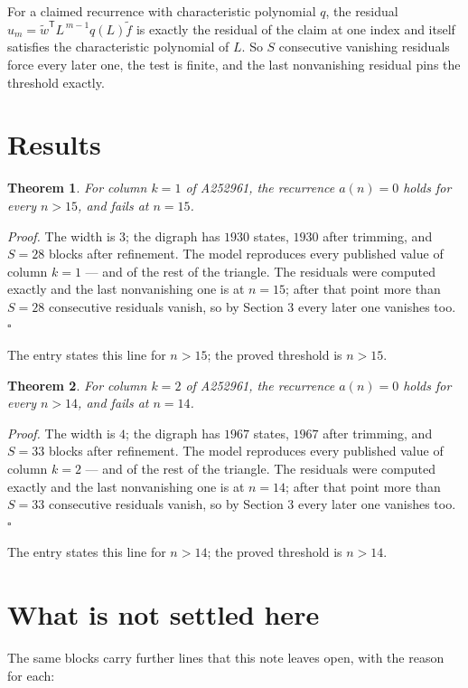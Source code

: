 \documentclass[11pt]{article}
\newtheorem{theorem}{Theorem}
\theoremstyle{definition}
\begin{document}
For a claimed recurrence with characteristic polynomial $q$, the residual $u_m = \tilde w^{\mathsf T}L^{\,m-1}q(L)\tilde f$ is exactly the residual of the claim at one index and itself satisfies the characteristic polynomial of $L$. So $S$ consecutive vanishing residuals force every later one, the test is finite, and the last nonvanishing residual pins the threshold exactly.

\section{Results}

\begin{theorem} For column $k = 1$ of A252961, the recurrence $a(n) = 0$ holds for every $n > 15$, and fails at $n = 15$.\end{theorem}

{\itshape Proof.} The width is $3$; the digraph has $1930$ states, $1930$ after trimming, and $S = 28$ blocks after refinement. The model reproduces every published value of column $k = 1$ --- and of the rest of the triangle. The residuals were computed exactly and the last nonvanishing one is at $n = 15$; after that point more than $S = 28$ consecutive residuals vanish, so by Section 3 every later one vanishes too. $\square$

The entry states this line for $n > 15$; the proved threshold is $n > 15$.

\begin{theorem} For column $k = 2$ of A252961, the recurrence $a(n) = 0$ holds for every $n > 14$, and fails at $n = 14$.\end{theorem}

{\itshape Proof.} The width is $4$; the digraph has $1967$ states, $1967$ after trimming, and $S = 33$ blocks after refinement. The model reproduces every published value of column $k = 2$ --- and of the rest of the triangle. The residuals were computed exactly and the last nonvanishing one is at $n = 14$; after that point more than $S = 33$ consecutive residuals vanish, so by Section 3 every later one vanishes too. $\square$

The entry states this line for $n > 14$; the proved threshold is $n > 14$.

\section{What is not settled here}

The same blocks carry further lines that this note leaves open, with the reason for each:
\end{document}
